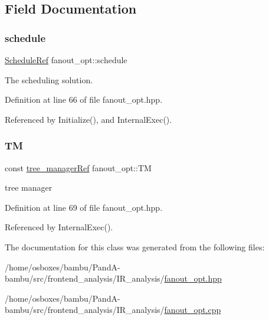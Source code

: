 \subsection{Field Documentation}
\mbox{\label{classfanout__opt_a33865012bc3aa6c23d83e553bc153cac}} 
\subsubsection{\texorpdfstring{schedule}{schedule}}
{\footnotesize\ttfamily \hyperlink{schedule_8hpp_af67f402958b3b52a1ec5cc4ce08ae3b9}{Schedule\+Ref} fanout\+\_\+opt\+::schedule\hspace{0.3cm}{\ttfamily [private]}}



The scheduling solution. 



Definition at line 66 of file fanout\+\_\+opt.\+hpp.



Referenced by Initialize(), and Internal\+Exec().

\mbox{\label{classfanout__opt_a264ac8a1b00265c3bdae24a20fd319ba}} 
\subsubsection{\texorpdfstring{TM}{TM}}
{\footnotesize\ttfamily const \hyperlink{tree__manager_8hpp_a96ff150c071ce11a9a7a1e40590f205e}{tree\+\_\+manager\+Ref} fanout\+\_\+opt\+::\+TM\hspace{0.3cm}{\ttfamily [private]}}



tree manager 



Definition at line 69 of file fanout\+\_\+opt.\+hpp.



Referenced by Internal\+Exec().



The documentation for this class was generated from the following files\+:\begin{DoxyCompactItemize}
\item 
/home/osboxes/bambu/\+Pand\+A-\/bambu/src/frontend\+\_\+analysis/\+I\+R\+\_\+analysis/\hyperlink{fanout__opt_8hpp}{fanout\+\_\+opt.\+hpp}\item 
/home/osboxes/bambu/\+Pand\+A-\/bambu/src/frontend\+\_\+analysis/\+I\+R\+\_\+analysis/\hyperlink{fanout__opt_8cpp}{fanout\+\_\+opt.\+cpp}\end{DoxyCompactItemize}
